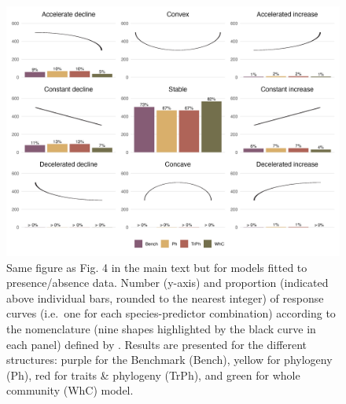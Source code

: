 \begin{figure}
\hypertarget{fig:chapt1supp25}{%
\centering
\includegraphics{03-Chapitre1/figures/supplementary/fig_supp25.png}
\caption{Same figure as Fig. 4 in the main text but for models fitted to
presence/absence data. Number (y-axis) and proportion (indicated above
individual bars, rounded to the nearest integer) of response curves
(i.e.~one for each species-predictor combination) according to the
nomenclature (nine shapes highlighted by the black curve in each panel)
defined by \textcite{Rigal_2020}. Results are presented for the
different structures: purple for the Benchmark (Bench), yellow for
phylogeny (Ph), red for traits \& phylogeny (TrPh), and green for whole
community (WhC) model.}\label{fig:chapt1supp25}
}
\end{figure}

